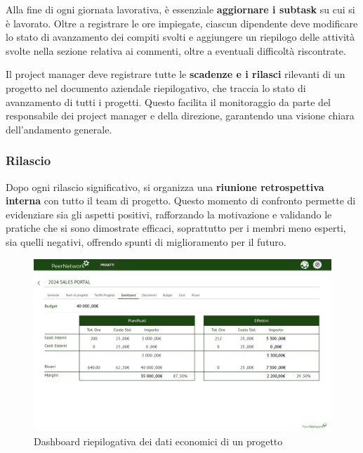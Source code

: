     Alla fine di ogni giornata lavorativa, è essenziale \textbf{aggiornare i subtask} su cui si è lavorato. Oltre a
    registrare le ore impiegate, ciascun dipendente deve modificare lo stato di avanzamento dei compiti svolti e aggiungere
    un riepilogo delle attività svolte nella sezione relativa ai commenti, oltre a eventuali difficoltà riscontrate.
    
    Il project manager deve registrare tutte le \textbf{scadenze e i rilasci} rilevanti di un progetto nel documento aziendale
    riepilogativo, che traccia lo stato di avanzamento di tutti i progetti. Questo facilita il monitoraggio da parte del
    responsabile dei project manager e della direzione, garantendo una visione chiara dell’andamento generale.

    \subsubsection{Rilascio}
    Dopo ogni rilascio significativo, si organizza una \textbf{riunione retrospettiva interna} con tutto il team di progetto. Questo momento
    di confronto permette di evidenziare sia gli aspetti positivi, rafforzando la motivazione e validando le pratiche che si sono dimostrate
    efficaci, soprattutto per i membri meno esperti, sia quelli negativi, offrendo spunti di miglioramento per il futuro.

\begin{figure}
    \centering
    \includegraphics[width=\linewidth]{figures/dashboardPAM.png}
    \caption{Dashboard riepilogativa dei dati economici di un progetto}
    \label{fig:pam-dashboard}
\end{figure}
